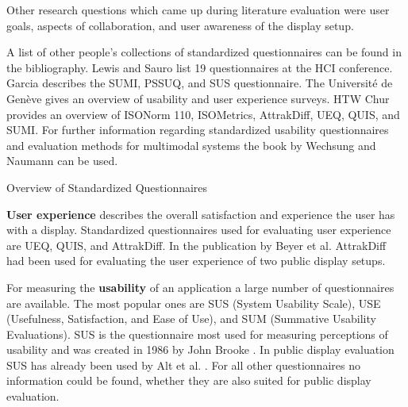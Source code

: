 	Other research questions which came up during literature evaluation were user goals, aspects of collaboration, and user awareness of the display setup.


	A list of other people's collections of standardized questionnaires can be found in the bibliography. Lewis and Sauro \cite{Lewis2013HCI} list 19 questionnaires at the HCI conference. Garcia \cite{Garcia2013UXResearch} describes the SUMI, PSSUQ, and SUS questionnaire. The Universit{\'e} de Gen{\`e}ve \cite{Geneve2014Wiki} gives an overview of usability and user experience surveys. HTW Chur \cite{Chur2014Questionnaires} provides an overview of ISONorm 110, ISOMetrics, AttrakDiff, UEQ, QUIS, and SUMI. For further information regarding standardized usability questionnaires and evaluation methods for multimodal systems the book by Wechsung and Naumann \cite{wechsung2008evaluation} can be used. 



		\begin{table}[p]
			\small
			\center
			\begin{adjustwidth}{-1.5cm}{}
			    
			    \caption[Standardized Questionnaires]{Overview of Standardized Questionnaires}
			\label{table:standardized-questionnaires}
			            \end{adjustwidth}

		\end{table}


	

\clearpage


	\textbf{User experience} describes the overall satisfaction and experience the user has with a display. Standardized questionnaires used for evaluating user experience are UEQ, QUIS, and AttrakDiff. In the publication by Beyer et al. \cite{Beyer2011} AttrakDiff had been used for evaluating the user experience of two public display setups.

	For measuring the \textbf{usability} of an application a large number of questionnaires are available. The most popular ones are SUS (System Usability Scale), USE (Usefulness, Satisfaction, and Ease of Use), and SUM (Summative Usability Evaluations). SUS is the questionnaire most used for measuring perceptions of usability and was created in 1986 by John Brooke \cite{SUSQuestionnaire}. In public display evaluation SUS has already been used by Alt et al. \cite{alt2011digifieds}. For all other questionnaires no information could be found, whether they are also suited for public display evaluation.

